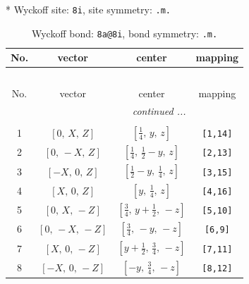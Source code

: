 \documentclass[fleqn,8pt]{jsarticle}
\begin{document}
* Wyckoff site: {\tt 8i}, site symmetry: {\tt .m.}
\renewcommand{\arraystretch}{1.2}
\begin{longtable}{cccc}
\caption{Wyckoff bond: {\tt 8a@8i}, bond symmetry: {\tt .m.}}
 \\
 \hline \hline
No. & vector & center & mapping \\ \hline \endfirsthead

\multicolumn{3}{l}{\tablename\ \thetable{}} \\
 \hline \hline
No. & vector & center & mapping \\ \hline \endhead

 \hline \hline
\multicolumn{3}{r}{\footnotesize\it continued ...} \\ \endfoot

 \hline \hline
\multicolumn{3}{r}{} \\ \endlastfoot

1 & $\left[ 0,\, X,\, Z \right]$ & $\left[ \frac{1}{4},\, y,\, z \right]$ & {\tt [1,14]} \\ \hline
2 & $\left[ 0,\, - X,\, Z \right]$ & $\left[ \frac{1}{4},\, \frac{1}{2} - y,\, z \right]$ & {\tt [2,13]} \\ \hline
3 & $\left[ - X,\, 0,\, Z \right]$ & $\left[ \frac{1}{2} - y,\, \frac{1}{4},\, z \right]$ & {\tt [3,15]} \\ \hline
4 & $\left[ X,\, 0,\, Z \right]$ & $\left[ y,\, \frac{1}{4},\, z \right]$ & {\tt [4,16]} \\ \hline
5 & $\left[ 0,\, X,\, - Z \right]$ & $\left[ \frac{3}{4},\, y + \frac{1}{2},\, - z \right]$ & {\tt [5,10]} \\ \hline
6 & $\left[ 0,\, - X,\, - Z \right]$ & $\left[ \frac{3}{4},\, - y,\, - z \right]$ & {\tt [6,9]} \\ \hline
7 & $\left[ X,\, 0,\, - Z \right]$ & $\left[ y + \frac{1}{2},\, \frac{3}{4},\, - z \right]$ & {\tt [7,11]} \\ \hline
8 & $\left[ - X,\, 0,\, - Z \right]$ & $\left[ - y,\, \frac{3}{4},\, - z \right]$ & {\tt [8,12]} \\
\end{longtable}
\renewcommand{\arraystretch}{1.2}
\end{document}
